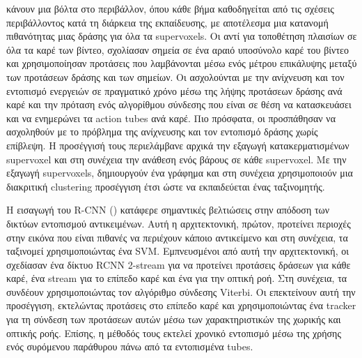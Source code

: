 κάνουν μια βόλτα στο περιβάλλον, όπου κάθε βήμα καθοδηγείται από τις σχέσεις περιβάλλοντος κατά τη διάρκεια της εκπαίδευσης, με αποτέλεσμα μια κατανομή  πιθανότητας μιας δράσης για όλα τα \en supervoxels\gr.
Οι \en\cite{DBLP:journals/corr/MettesGS16} \gr αντί για τοποθέτηση  πλαισίων σε όλα τα καρέ των βίντεο, σχολίασαν σημεία σε ένα αραιό  υποσύνολο καρέ του  βίντεο και χρησιμοποίησαν
προτάσεις που λαμβάνονται μέσω ενός μέτρου επικάλυψης μεταξύ των προτάσεων δράσης και των σημείων.
Οι \en\cite{DBLP:journals/corr/BehlSSSCT17} \gr ασχολούνται με  την ανίχνευση και τον εντοπισμό  ενεργειών σε πραγματικό χρόνο μέσω της λήψης προτάσεων δράσης ανά καρέ και την πρόταση ενός αλγορίθμου
σύνδεσης που είναι σε θέση να κατασκευάσει και να ενημερώνει τα \en action tubes \gr ανά καρέ. Πιο πρόσφατα, οι  \en\cite{8237344} \gr προσπάθησαν  να ασχοληθούν  με το πρόβλημα της ανίχνευσης και
τον εντοπισμό δράσης χωρίς επίβλεψη. Η προσέγγισή τους περιελάμβανε αρχικά την εξαγωγή  κατακερματισμένων \en supervoxel \gr
και στη συνέχεια την ανάθεση ενός βάρους σε κάθε \en supervoxel\gr. Με την εξαγωγή \en supervoxels\gr, δημιουργούν ένα γράφημα και
στη συνέχεια χρησιμοποιούν μια διακριτική \en clustering \gr προσέγγιση έτσι ώστε να εκπαιδεύεται ένας ταξινομητής.

Η εισαγωγή του \en R-CNN (\cite{DBLP:journals/corr/GirshickDDM13}) \gr κατάφερε σημαντικές βελτιώσεις
στην  απόδοση των δικτύων εντοπισμού αντικειμένων. Αυτή η αρχιτεκτονική,
πρώτον, προτείνει περιοχές στην εικόνα που είναι πιθανές να περιέχουν κάποιο αντικείμενο και
στη συνέχεια, τα ταξινομεί χρησιμοποιώντας ένα \en SVM\gr. Εμπνευσμένοι από αυτή την αρχιτεκτονική,
οι \en \cite{DBLP:journals/corr/GkioxariM14} \gr σχεδίασαν ένα δίκτυο \en RCNN 2-stream \gr για να προτείνει 
προτάσεις δράσεων  για κάθε καρέ, ένα \en stream \gr για το επίπεδο καρέ και ένα για την 
οπτική ροή. Στη συνέχεια, τα συνδέουν χρησιμοποιώντας τον αλγόριθμο σύνδεσης \en Viterbi\gr.
Οι \en \cite{DBLP:journals/corr/WeinzaepfelHS15} \gr επεκτείνουν αυτή την προσέγγιση, εκτελώντας
προτάσεις στο επίπεδο καρέ  και χρησιμοποιώντας ένα \en tracker \gr για τη σύνδεση των προτάσεων αυτών μέσω των
χαρακτηριστικών της χωρικής και οπτικής ροής. Επίσης, η μέθοδός τους εκτελεί χρονικό εντοπισμό μέσω της χρήσης
ενός συρόμενου παράθυρου πάνω από τα εντοπισμένα \en tubes\gr.   \par

